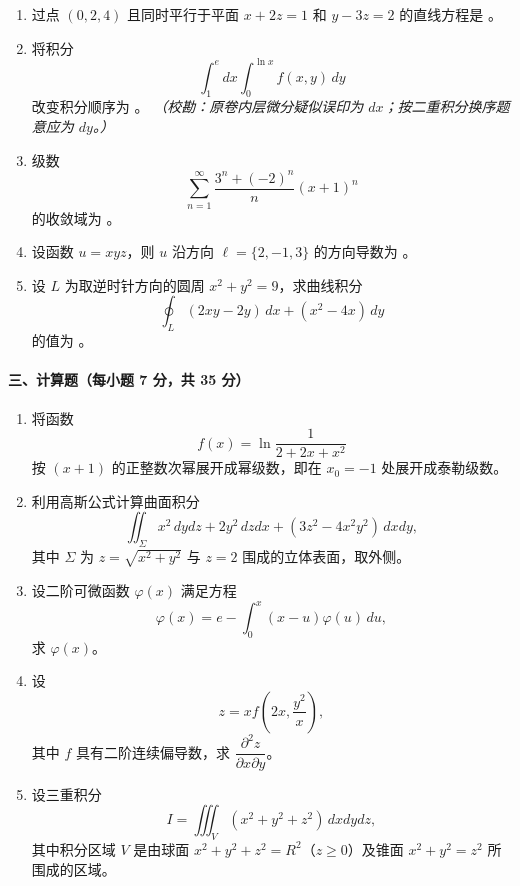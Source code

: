 \begin{enumerate}
  \item 过点 $(0,2,4)$ 且同时平行于平面 $x+2z=1$ 和 $y-3z=2$ 的直线方程是 \underline{\hspace{4cm}}。

  \item 将积分
  \[
    \int_1^e dx\int_0^{\ln x} f(x,y)\,dy
  \]
  改变积分顺序为 \underline{\hspace{4cm}}。
  \textit{（校勘：原卷内层微分疑似误印为 $dx$；按二重积分换序题意应为 $dy$。）}

  \item 级数
  \[
    \sum_{n=1}^{\infty}\frac{3^n+(-2)^n}{n}(x+1)^n
  \]
  的收敛域为 \underline{\hspace{4cm}}。

  \item 设函数 $u=xyz$，则 $u$ 沿方向 $\ell=\{2,-1,3\}$ 的方向导数为 \underline{\hspace{4cm}}。

  \item 设 $L$ 为取逆时针方向的圆周 $x^2+y^2=9$，求曲线积分
  \[
    \oint_L (2xy-2y)\,dx+(x^2-4x)\,dy
  \]
  的值为 \underline{\hspace{4cm}}。
\end{enumerate}

\paragraph{三、计算题（每小题 7 分，共 35 分）}

\begin{enumerate}
  \item 将函数
  \[
    f(x)=\ln\frac{1}{2+2x+x^2}
  \]
  按 $(x+1)$ 的正整数次幂展开成幂级数，即在 $x_0=-1$ 处展开成泰勒级数。

  \item 利用高斯公式计算曲面积分
  \[
    \iint_{\Sigma}x^2\,dydz+2y^2\,dzdx+(3z^2-4x^2y^2)\,dxdy,
  \]
  其中 $\Sigma$ 为 $z=\sqrt{x^2+y^2}$ 与 $z=2$ 围成的立体表面，取外侧。

  \item 设二阶可微函数 $\varphi(x)$ 满足方程
  \[
    \varphi(x)=e-\int_0^x (x-u)\varphi(u)\,du,
  \]
  求 $\varphi(x)$。

  \item 设
  \[
    z=xf\left(2x,\frac{y^2}{x}\right),
  \]
  其中 $f$ 具有二阶连续偏导数，求 $\dfrac{\partial^2 z}{\partial x\partial y}$。

  \item 设三重积分
  \[
    I=\iiint_V (x^2+y^2+z^2)\,dxdydz,
  \]
  其中积分区域 $V$ 是由球面 $x^2+y^2+z^2=R^2$（$z\ge 0$）及锥面 $x^2+y^2=z^2$ 所围成的区域。
\end{enumerate}

